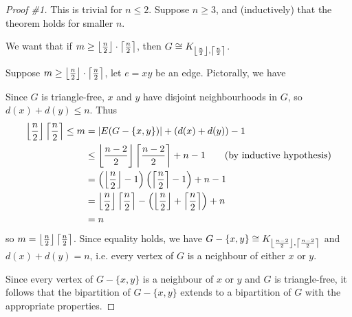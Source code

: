 \documentclass[main.tex]{subfiles}
\begin{document}
\begin{proof}[Proof \#1]
  This is trivial for $n\leq 2$.
  Suppose $n\geq 3$, and (inductively) that the theorem holds for smaller $n$.

  We want that if $m\geq\left\lfloor \frac n 2 \right\rfloor\cdot\left\lceil \frac n 2 \right\rceil$,
  then $G\cong K_{\left\lfloor \frac n 2 \right\rfloor,\left\lceil \frac n 2 \right\rceil}$.

  Suppose $m\geq\left\lfloor \frac n 2 \right\rfloor\cdot\left\lceil \frac n 2 \right\rceil$, let $e = xy$ be an edge.
  Pictorally, we have
  \begin{center}
  \end{center}

  Since $G$ is triangle-free, $x$ and $y$ have disjoint neighbourhoods in $G$,
  so $d(x) + d(y)\leq n$.
  Thus
  \begin{align*}
    \left\lfloor \frac n 2 \right\rfloor\left\lceil \frac n 2 \right\rceil \leq m
    &= |E(G - \{x,y\})| + (d(x) + d(y)) - 1 \\
    &\leq \left\lfloor \frac{n-2}{2} \right\rfloor\left\lceil \frac{n-2}{2} \right\rceil + n - 1 \tag{by inductive hypothesis} \\
    &= \left(\left\lfloor \frac n 2 \right\rfloor-1\right)\left(\left\lceil \frac n 2 \right\rceil-1\right) + n - 1 \\
    &= \left\lfloor \frac n 2 \right\rfloor\left\lceil \frac n 2 \right\rceil - \left(\left\lfloor \frac n 2 \right\rfloor + \left\lceil \frac n 2 \right\rceil\right) + n \\
    &= n
  \end{align*}
  so $m = \left\lfloor \frac n 2 \right\rfloor\left\lceil \frac n 2 \right\rceil$.
  Since equality holds, we have
  $G - \{x,y\}\cong K_{\left\lfloor \frac{n-2}{2} \right\rfloor,\left\lceil \frac{n-2}{2} \right\rceil}$ and
  $d(x) + d(y) = n$, i.e. every vertex of $G$ is a neighbour of either $x$ or $y$.

  Since every vertex of $G - \{x,y\}$ is a neighbour of $x$ or $y$ and $G$ is
  triangle-free, it follows that the bipartition of $G - \{x,y\}$ extends to
  a bipartition of $G$ with the appropriate properties.
\end{proof}
\end{document}
